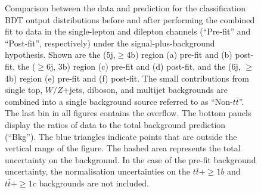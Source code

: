\begin{figure}[htbp!]
\captionsetup{width=0.85\textwidth}  \caption{\small Comparison between the data and prediction for the classification BDT output distributions before and after performing the combined fit to data in the single-lepton and dilepton channels (``Pre-fit'' and ``Post-fit'', respectively) under the signal-plus-background hypothesis. Shown are the (5j,$\ge$4b) region (a) pre-fit and (b) post-fit, the ($\ge$6j, 3b) region (c) pre-fit and (d) post-fit, and the (6j, $\ge$4b) region (e) pre-fit and (f) post-fit.
The small contributions from single top, $W/Z$+jets, diboson, and multijet backgrounds are combined into a single background source  referred to as ``Non-$t\bar{t}$''. The last bin in all figures contains the overflow. The bottom panels display the ratios of data to the total background prediction (``Bkg''). The blue triangles indicate points that are outside the vertical range of the figure. The hashed area represents the total uncertainty on the background. In the case of the pre-fit background uncertainty, the normalisation uncertainties on the $t\bar{t}+\ge1b$ and $t\bar{t}+\ge1c$ backgrounds are not included.}
\label{sec:tth:fig:bdt}
\end{figure}


